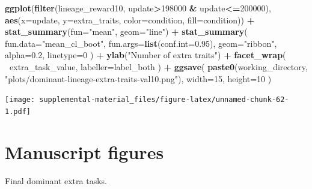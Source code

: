 \documentclass[]{book}
\newenvironment{Shaded}{\begin{snugshade}}{\end{snugshade}}
\newcommand{\DataTypeTok}[1]{\textcolor[rgb]{0.13,0.29,0.53}{#1}}
\newcommand{\DecValTok}[1]{\textcolor[rgb]{0.00,0.00,0.81}{#1}}
\newcommand{\FloatTok}[1]{\textcolor[rgb]{0.00,0.00,0.81}{#1}}
\newcommand{\KeywordTok}[1]{\textcolor[rgb]{0.13,0.29,0.53}{\textbf{#1}}}
\newcommand{\NormalTok}[1]{#1}
\newcommand{\OperatorTok}[1]{\textcolor[rgb]{0.81,0.36,0.00}{\textbf{#1}}}
\newcommand{\StringTok}[1]{\textcolor[rgb]{0.31,0.60,0.02}{#1}}
\begin{document}
\begin{Shaded}
\begin{Highlighting}[]
\KeywordTok{ggplot}\NormalTok{(}\KeywordTok{filter}\NormalTok{(lineage_reward10, update}\OperatorTok{>}\DecValTok{198000} \OperatorTok{&}\StringTok{ }\NormalTok{update}\OperatorTok{<=}\DecValTok{200000}\NormalTok{), }\KeywordTok{aes}\NormalTok{(}\DataTypeTok{x=}\NormalTok{update, }\DataTypeTok{y=}\NormalTok{extra_traits, }\DataTypeTok{color=}\NormalTok{condition, }\DataTypeTok{fill=}\NormalTok{condition)) }\OperatorTok{+}
\StringTok{  }\KeywordTok{stat_summary}\NormalTok{(}\DataTypeTok{fun=}\StringTok{"mean"}\NormalTok{, }\DataTypeTok{geom=}\StringTok{"line"}\NormalTok{) }\OperatorTok{+}
\StringTok{  }\KeywordTok{stat_summary}\NormalTok{(}
    \DataTypeTok{fun.data=}\StringTok{"mean_cl_boot"}\NormalTok{,}
    \DataTypeTok{fun.args=}\KeywordTok{list}\NormalTok{(}\DataTypeTok{conf.int=}\FloatTok{0.95}\NormalTok{),}
    \DataTypeTok{geom=}\StringTok{"ribbon"}\NormalTok{,}
    \DataTypeTok{alpha=}\FloatTok{0.2}\NormalTok{,}
    \DataTypeTok{linetype=}\DecValTok{0}
\NormalTok{  ) }\OperatorTok{+}
\StringTok{  }\KeywordTok{ylab}\NormalTok{(}\StringTok{"Number of extra traits"}\NormalTok{) }\OperatorTok{+}
\StringTok{  }\KeywordTok{facet_wrap}\NormalTok{(}
    \OperatorTok{~}\NormalTok{extra_task_value,}
    \DataTypeTok{labeller=}\NormalTok{label_both}
\NormalTok{  ) }\OperatorTok{+}
\StringTok{  }\KeywordTok{ggsave}\NormalTok{(}
    \KeywordTok{paste0}\NormalTok{(working_directory, }\StringTok{"plots/dominant-lineage-extra-traits-val10.png"}\NormalTok{),}
    \DataTypeTok{width=}\DecValTok{15}\NormalTok{,}
    \DataTypeTok{height=}\DecValTok{10}
\NormalTok{  )}
\end{Highlighting}
\end{Shaded}

\texttt{[image: supplemental-material\_files/figure-latex/unnamed-chunk-62-1.pdf]}

\hypertarget{manuscript-figures-1}{%
\section{Manuscript figures}\label{manuscript-figures-1}}

Final dominant extra tasks.
\end{document}

